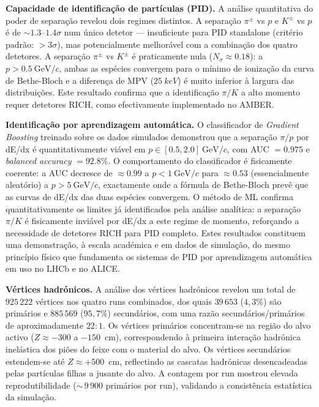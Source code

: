 \documentclass[12pt,a4paper]{article}
\begin{document}
\textbf{Capacidade de identificação de partículas (PID).}
A análise quantitativa do poder de separação revelou dois regimes distintos.
A separação $\pi^\pm$ vs $p$ e $K^\pm$ vs $p$ é de $\sim 1.3$--$1.4\sigma$
num único detetor --- insuficiente para PID standalone (critério padrão:
$> 3\sigma$), mas potencialmente melhorável com a combinação dos quatro detetores.
A separação $\pi^\pm$ vs $K^\pm$ é praticamente nula ($N_\sigma \approx 0.18$):
a $p > 0.5~\text{GeV}/c$, ambas as espécies convergem para o mínimo de ionização
da curva de Bethe-Bloch e a diferença de MPV ($\SI{25}{keV}$) é muito inferior
à largura das distribuições. Este resultado confirma que a identificação
$\pi/K$ a alto momento requer detetores RICH, como efectivamente implementado
no AMBER.

\textbf{Identificação por aprendizagem automática.}
O classificador de \textit{Gradient Boosting} treinado sobre os dados simulados
demonstrou que a separação $\pi/p$ por dE/dx é quantitativamente viável em
$p \in [0.5, 2.0]~\text{GeV}/c$, com AUC $= 0.975$ e \textit{balanced accuracy}
$= 92.8\%$. O comportamento do classificador é fisicamente coerente: a AUC
decresce de $\approx 0.99$ a $p < 1~\text{GeV}/c$ para $\approx 0.53$
(essencialmente aleatório) a $p > 5~\text{GeV}/c$, exactamente onde a fórmula
de Bethe-Bloch prevê que as curvas de dE/dx das duas espécies convergem.
O método de ML confirma quantitativamente os limites já identificados pela
análise analítica: a separação $\pi/K$ é fisicamente inviável por dE/dx a este
regime de momento, reforçando a necessidade de detetores RICH para PID
completo. Estes resultados constituem uma demonstração, à escala académica
e em dados de simulação, do mesmo princípio físico que fundamenta os sistemas
de PID por aprendizagem automática em uso no LHCb e no ALICE.

\textbf{Vértices hadrónicos.}
A análise dos vértices hadrónicos revelou um total de $925\,222$ vértices
nos quatro runs combinados, dos quais $39\,653$ ($4{,}3\%$) são primários e
$885\,569$ ($95{,}7\%$) secundários, com uma razão secundários/primários de
aproximadamente $22\!:\!1$. Os vértices primários concentram-se na região do
alvo activo ($Z \approx -300$ a $-150$~cm), correspondendo à primeira interação
hadrónica inelástica dos piões do feixe com o material do alvo. Os vértices
secundários estendem-se até $Z \approx +500$~cm, reflectindo as cascatas
hadrónicas desencadeadas pelas partículas filhas a jusante do alvo. A contagem
por run mostrou elevada reprodutibilidade (${\sim}\,9\,900$ primários por run),
validando a consistência estatística da simulação.
\end{document}
